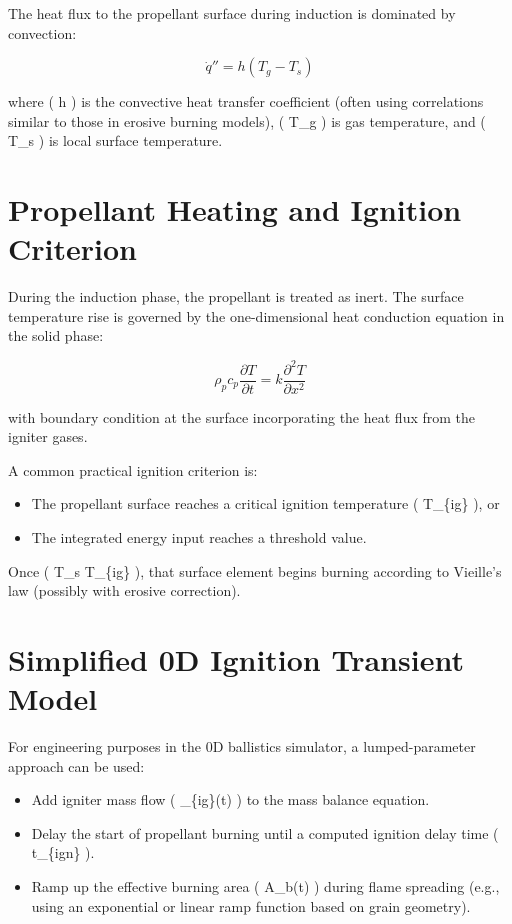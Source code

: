 \documentclass[
  letterpaper,
  DIV=11,
  numbers=noendperiod]{scrreprt}
\providecommand{\tightlist}{%
  \setlength{\itemsep}{0pt}\setlength{\parskip}{0pt}}
\begin{document}
The heat flux to the propellant surface during induction is dominated by
convection:

\[
\dot{q}'' = h (T_g - T_s)
\]

where ( h ) is the convective heat transfer coefficient (often using
correlations similar to those in erosive burning models), ( T\_g ) is
gas temperature, and ( T\_s ) is local surface temperature.

\section{Propellant Heating and Ignition
Criterion}\label{propellant-heating-and-ignition-criterion}

During the induction phase, the propellant is treated as inert. The
surface temperature rise is governed by the one-dimensional heat
conduction equation in the solid phase:

\[
\rho_p c_p \frac{\partial T}{\partial t} = k \frac{\partial^2 T}{\partial x^2}
\]

with boundary condition at the surface incorporating the heat flux from
the igniter gases.

A common practical ignition criterion is:

\begin{itemize}
\tightlist
\item
  The propellant surface reaches a critical ignition temperature (
  T\_\{ig\} ), or
\item
  The integrated energy input reaches a threshold value.
\end{itemize}

Once ( T\_s \geq T\_\{ig\} ), that surface element begins burning
according to Vieille's law (possibly with erosive correction).

\section{Simplified 0D Ignition Transient
Model}\label{simplified-0d-ignition-transient-model}

For engineering purposes in the 0D ballistics simulator, a
lumped-parameter approach can be used:

\begin{itemize}
\tightlist
\item
  Add igniter mass flow ( \_\{ig\}(t) ) to the mass balance
  equation.
\item
  Delay the start of propellant burning until a computed ignition delay
  time ( t\_\{ign\} ).
\item
  Ramp up the effective burning area ( A\_b(t) ) during flame spreading
  (e.g., using an exponential or linear ramp function based on grain
  geometry).
\end{itemize}
\end{document}
